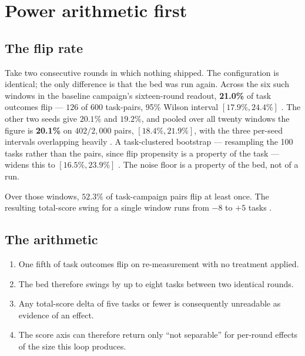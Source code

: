 \section{Power arithmetic first}
\label{sec:power}

\subsection*{The flip rate}

Take two consecutive rounds in which nothing shipped. The configuration is
identical; the only difference is that the bed was run again. Across the
six such windows in the baseline campaign's sixteen-round readout,
\textbf{21.0\%} of task outcomes flip --- $126$ of $600$ task-pairs, 95\%
Wilson interval $[17.9\%, 24.4\%]$ . The other two seeds give
$20.1\%$ and $19.2\%$, and pooled over all twenty windows the figure is
\textbf{20.1\%} on $402/2{,}000$ pairs, $[18.4\%, 21.9\%]$, with the three
per-seed intervals overlapping heavily . A task-clustered bootstrap
--- resampling the 100 tasks rather than the pairs, since flip propensity
is a property of the task --- widens this to $[16.5\%, 23.9\%]$ . The noise floor is a property of the bed, not
of a run.

Over those windows, $52.3\%$ of task-campaign pairs flip at least once.
The resulting total-score swing for a single window runs from $-8$ to
$+5$ tasks .

\subsection*{The arithmetic}

\begin{enumerate}
  \item One fifth of task outcomes flip on re-measurement with no treatment
        applied.
  \item The bed therefore swings by up to eight tasks between two
        identical rounds.
  \item Any total-score delta of five tasks or fewer is consequently
        unreadable as evidence of an effect.
  \item The score axis can therefore return only ``not separable'' for
        per-round effects of the size this loop produces.
\end{enumerate}

